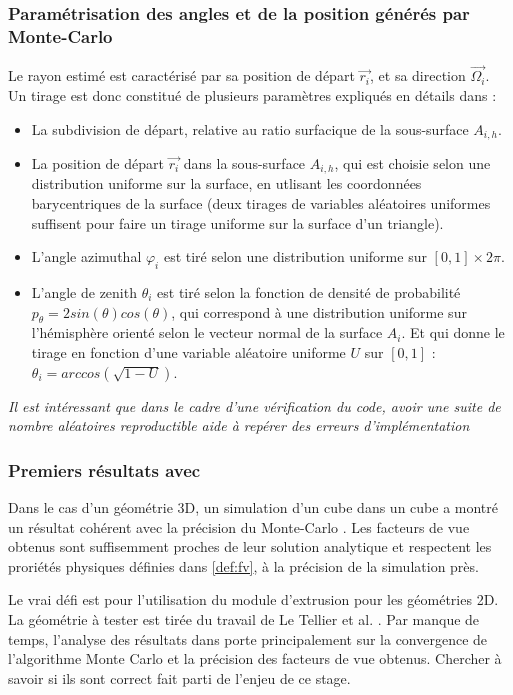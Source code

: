 \subsubsection{Paramétrisation des angles et de la position générés par Monte-Carlo}
Le rayon estimé est caractérisé par sa position de départ $\vec{r_i}$, et sa direction $\vec{\Omega_i}$. Un tirage est donc constitué de plusieurs paramètres expliqués en détails dans \cite{lorenzo}:
\begin{itemize}
    \item La subdivision de départ, relative au ratio surfacique de la sous-surface $A_{i,h}$.
    \item La position de départ $\vec{r_i}$ dans la sous-surface $A_{i,h}$, qui est choisie selon une distribution uniforme sur la surface, en utlisant les coordonnées barycentriques de la surface (deux tirages de variables aléatoires uniformes suffisent pour faire un tirage uniforme sur la surface d'un triangle).
    \item L'angle azimuthal $\varphi_i$ est tiré selon une distribution uniforme sur $[0, 1] \times 2\pi$.
    \item L'angle de zenith $\theta_i$ est tiré selon la fonction de densité de probabilité $p_\theta = 2sin(\theta)cos(\theta)$, qui correspond à une distribution uniforme sur l'hémisphère orienté selon le vecteur normal de la surface $A_i$. Et qui donne le tirage en fonction d'une variable aléatoire uniforme $U$ sur $[0, 1]$ : $\theta_i = arccos(\sqrt{1- U})$.
\end{itemize}

\textit{Il est intéressant que dans le cadre d'une vérification du code, avoir une suite de nombre aléatoires reproductible aide à repérer des erreurs d'implémentation}

\subsubsection{Premiers résultats avec }
Dans le cas d'un géométrie 3D, un simulation d'un cube dans un cube a montré un résultat cohérent avec la précision du Monte-Carlo \cite{lorenzo}. Les facteurs de vue obtenus sont suffisemment proches de leur solution analytique et respectent les proriétés physiques définies dans \ref{def:fv}, à la précision de la simulation près.

Le vrai défi est pour l'utilisation du module d'extrusion pour les géométries 2D. La géométrie à tester est tirée du travail de Le Tellier et al. \cite{Romain25}. Par manque de temps, l'analyse des résultats dans \cite{lorenzo} porte principalement sur la convergence de l'algorithme Monte Carlo et la précision des facteurs de vue obtenus. Chercher à savoir si ils sont correct fait parti de l'enjeu de ce stage.


